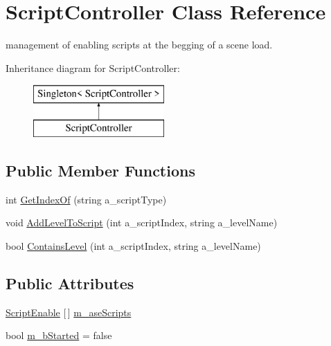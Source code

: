 \hypertarget{class_script_controller}{}\section{Script\+Controller Class Reference}
\label{class_script_controller}


management of enabling scripts at the begging of a scene load.  


Inheritance diagram for Script\+Controller\+:\begin{figure}[H]
\begin{center}
\leavevmode
\includegraphics[height=2.000000cm]{class_script_controller}
\end{center}
\end{figure}
\subsection*{Public Member Functions}
\begin{DoxyCompactItemize}
\item 
int \mbox{\hyperlink{class_script_controller_a211378d77157f39fa7427525542aee2c}{Get\+Index\+Of}} (string a\+\_\+script\+Type)
\item 
void \mbox{\hyperlink{class_script_controller_a393d619523c40e6bdbdc3eb6827e0471}{Add\+Level\+To\+Script}} (int a\+\_\+script\+Index, string a\+\_\+level\+Name)
\item 
bool \mbox{\hyperlink{class_script_controller_af6d363e91530835cb06a29ae66cfdeb3}{Contains\+Level}} (int a\+\_\+script\+Index, string a\+\_\+level\+Name)
\end{DoxyCompactItemize}
\subsection*{Public Attributes}
\begin{DoxyCompactItemize}
\item 
\mbox{\hyperlink{struct_script_enable}{Script\+Enable}} \mbox{[}$\,$\mbox{]} \mbox{\hyperlink{class_script_controller_ad70a0da6b194de9d0b1b254727df3361}{m\+\_\+ase\+Scripts}}
\item 
bool \mbox{\hyperlink{class_script_controller_a20ad7aed606af1bf812f6e15708b955a}{m\+\_\+b\+Started}} = false
\end{DoxyCompactItemize}
